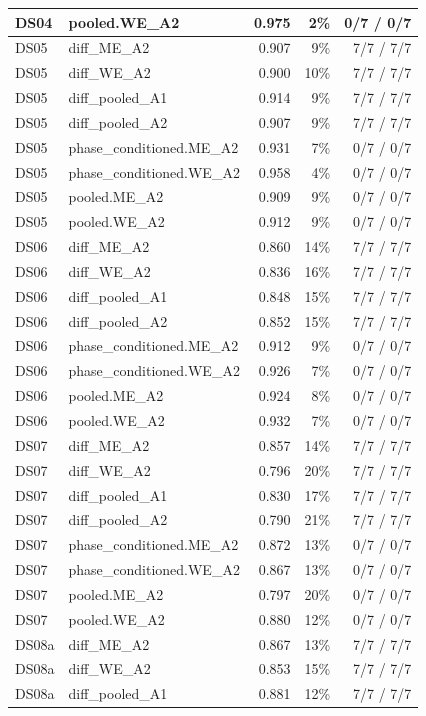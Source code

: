 \documentclass[10pt]{article}
\begin{document}
{\begin{longtable}{llrrr}
DS04 & pooled.WE\_A2 & 0.975 & 2\% & 0/7 / 0/7 \\
\midrule
DS05 & diff\_ME\_A2 & 0.907 & 9\% & 7/7 / 7/7 \\
DS05 & diff\_WE\_A2 & 0.900 & 10\% & 7/7 / 7/7 \\
DS05 & diff\_pooled\_A1 & 0.914 & 9\% & 7/7 / 7/7 \\
DS05 & diff\_pooled\_A2 & 0.907 & 9\% & 7/7 / 7/7 \\
DS05 & phase\_conditioned.ME\_A2 & 0.931 & 7\% & 0/7 / 0/7 \\
DS05 & phase\_conditioned.WE\_A2 & 0.958 & 4\% & 0/7 / 0/7 \\
DS05 & pooled.ME\_A2 & 0.909 & 9\% & 0/7 / 0/7 \\
DS05 & pooled.WE\_A2 & 0.912 & 9\% & 0/7 / 0/7 \\
\midrule
DS06 & diff\_ME\_A2 & 0.860 & 14\% & 7/7 / 7/7 \\
DS06 & diff\_WE\_A2 & 0.836 & 16\% & 7/7 / 7/7 \\
DS06 & diff\_pooled\_A1 & 0.848 & 15\% & 7/7 / 7/7 \\
DS06 & diff\_pooled\_A2 & 0.852 & 15\% & 7/7 / 7/7 \\
DS06 & phase\_conditioned.ME\_A2 & 0.912 & 9\% & 0/7 / 0/7 \\
DS06 & phase\_conditioned.WE\_A2 & 0.926 & 7\% & 0/7 / 0/7 \\
DS06 & pooled.ME\_A2 & 0.924 & 8\% & 0/7 / 0/7 \\
DS06 & pooled.WE\_A2 & 0.932 & 7\% & 0/7 / 0/7 \\
\midrule
DS07 & diff\_ME\_A2 & 0.857 & 14\% & 7/7 / 7/7 \\
DS07 & diff\_WE\_A2 & 0.796 & 20\% & 7/7 / 7/7 \\
DS07 & diff\_pooled\_A1 & 0.830 & 17\% & 7/7 / 7/7 \\
DS07 & diff\_pooled\_A2 & 0.790 & 21\% & 7/7 / 7/7 \\
DS07 & phase\_conditioned.ME\_A2 & 0.872 & 13\% & 0/7 / 0/7 \\
DS07 & phase\_conditioned.WE\_A2 & 0.867 & 13\% & 0/7 / 0/7 \\
DS07 & pooled.ME\_A2 & 0.797 & 20\% & 0/7 / 0/7 \\
DS07 & pooled.WE\_A2 & 0.880 & 12\% & 0/7 / 0/7 \\
\midrule
DS08a & diff\_ME\_A2 & 0.867 & 13\% & 7/7 / 7/7 \\
DS08a & diff\_WE\_A2 & 0.853 & 15\% & 7/7 / 7/7 \\
DS08a & diff\_pooled\_A1 & 0.881 & 12\% & 7/7 / 7/7 \\

\end{longtable}}
\end{document}
